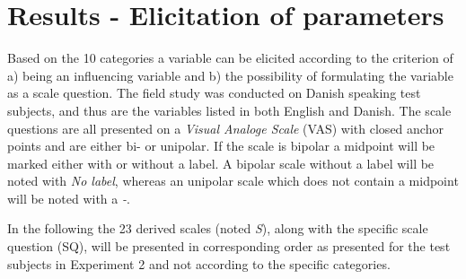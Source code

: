 \section{Results - Elicitation of parameters}
\label{ResultsElicitation}
%
%
Based on the 10 categories a variable can be elicited according to the criterion of a) being an influencing variable and b) the possibility of formulating the variable as a scale question. The field study was conducted on Danish speaking test subjects, and thus are the variables listed in both English and Danish. The scale questions are all presented on a \textit{Visual Analoge Scale} (VAS) with closed anchor points and are either bi- or unipolar. If the scale is bipolar a midpoint will be marked either with or without a label. A bipolar scale without a label will be noted with \textit{No label}, whereas an unipolar scale which does not contain a midpoint will be noted with a \textit{-}. 

In the following the 23 derived scales (noted \textit{S}), along with the specific scale question (SQ), will be presented in corresponding order as presented for the test subjects in Experiment 2 and not according to the specific categories.\\ 

